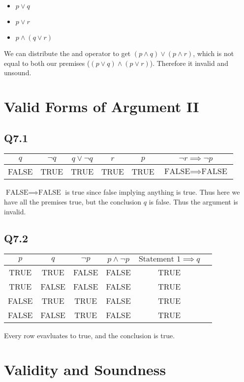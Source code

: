 \documentclass[12pt]{article}
\begin{document}
\begin{itemize}
    \item $p \lor q$
    \item $p \lor r$
    \item $p \land (q \lor r)$
\end{itemize}
We can distribute the and operator to get $(p \land q) \lor (p \land r)$, 
which is not equal to both our premises ($(p \lor q) \land (p \lor r)$).
Therefore it invalid and unsound.

\section{Valid Forms of Argument II}
\subsection{Q7.1}

\begin{tabular}{|c|c|c|c|c|c|}
    \hline 
    $q$ & $\neg q$ & $q \lor \neg q$ & $r$ & $p$ & $\neg r \implies \neg p$ \\
    \hline
    FALSE & TRUE & TRUE & TRUE & TRUE & $\text{FALSE} \implies \text{FALSE}$ \\
    \hline
\end{tabular}
\newline
$\text{FALSE} \implies \text{FALSE}$ is true since false implying anything is true. Thus here 
we have all the premises true, but the conclusion $q$ is false. Thus 
the argument is invalid.

\subsection{Q7.2}
\begin{tabular}{|c|c|c|c|c|c|}
    \hline
    $p$ & $q$ & $\neg p$ & $p \land \neg p$ & $\text{Statement 1} \implies q$\\
    \hline
    TRUE & TRUE & FALSE & FALSE & TRUE \\
    \hline
    TRUE & FALSE & FALSE & FALSE & TRUE \\
    \hline
    FALSE & TRUE & TRUE & FALSE & TRUE \\
    \hline
    FALSE & FALSE & TRUE & FALSE & TRUE \\
    \hline
\end{tabular}
\newline
Every row evavluates to true, and the conclusion is true.

\section{Validity and Soundness}
\end{document}
